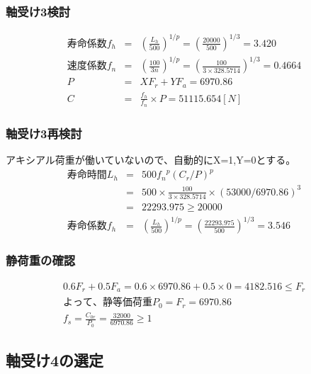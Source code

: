 \documentclass[a4j,twoside,openright,11pt]{jreport}
\begin{document}
\subsubsection{軸受け3検討}
\begin{eqnarray}
寿命係数f_h &=& \left( \frac{L_h}{500} \right)^{1/p} = \left( \frac{20000}{500} \right)^{1/3} = 3.420\\
速度係数f_n &=& \left( \frac{100}{3n} \right)^{1/p} = \left( \frac{100}{3 \times 328.5714} \right)^{1/3} = 0.4664\\
P &=& XF_r+YF_a = 6970.86\\
C &=& \frac{f_h}{f_n} \times P = 51115.654[N]
\end{eqnarray}

\subsubsection{軸受け3再検討}
アキシアル荷重が働いていないので、自動的にX=1,Y=0とする。
\begin{eqnarray}
寿命時間L_h &=& 500{f_n}^p(C_r/P)^p\\
           &=& 500 \times \frac{100}{3 \times 328.5714} \times (53000/6970.86)^3\\
           &=& 22293.975 \geq 20000\\
寿命係数f_h &=& \left( \frac{L_h}{500} \right)^{1/p} = \left( \frac{22293.975}{500} \right)^{1/3} = 3.546
\end{eqnarray}

\subsubsection{静荷重の確認}
\begin{eqnarray}
0.6F_r+0.5F_a=0.6 \times 6970.86 + 0.5 \times 0 = 4182.516 \leq F_r\\
よって、静等価荷重P_0 = F_r = 6970.86\\
f_s = \frac{C_{0r}}{P_0} = \frac{32000}{6970.86} \geq 1
\end{eqnarray}







\newpage
\subsection{軸受け4の選定}
\end{document}
